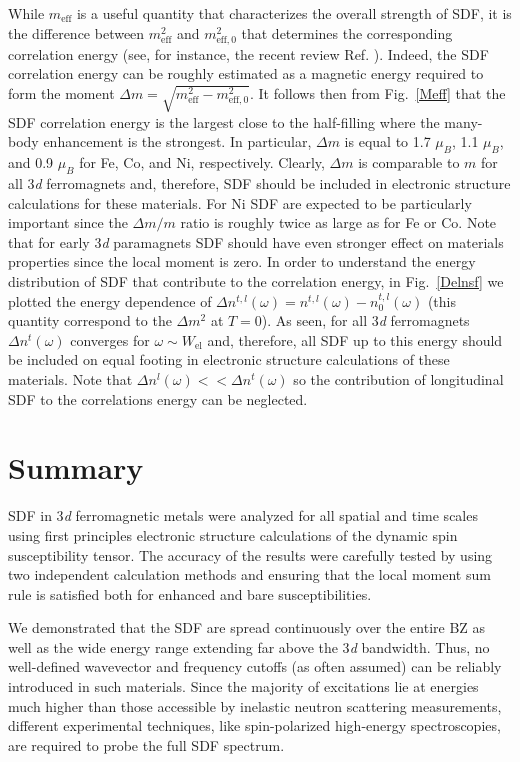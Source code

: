 While $m_{\text{eff}}$ is a useful quantity that characterizes the overall strength of SDF, it is the difference between $m^2_{\text{eff}}$ and $m^2_{\text{eff},0}$ that determines the corresponding correlation energy (see, for instance, the recent review Ref. \citep{RPA}). Indeed, the SDF correlation energy can be roughly estimated as a magnetic energy required to form the moment $\Delta m=\sqrt{m^2_{\text{eff}}-m^2_{\text{eff},0}}$. It follows then from Fig.~\ref{Meff} that the SDF correlation energy is the largest close to the half-filling where the many-body enhancement is the strongest. In particular, $\Delta m$ is equal to 1.7 $\mu_B$, 1.1 $\mu_B$, and 0.9 $\mu_B$ for Fe, Co, and Ni, respectively. Clearly, $\Delta m$ is comparable to $m$ for all 3\emph{d} ferromagnets and, therefore, SDF should be included in electronic structure calculations for these materials. For Ni SDF are expected to be particularly important since the $\Delta m/m$ ratio is roughly twice as large as for Fe or Co. Note that for early 3\emph{d} paramagnets SDF should have even stronger effect on materials properties since the local moment is zero.\citep{Wysocki} In order to understand the energy distribution of SDF that contribute to the correlation energy, in Fig.~\ref{Delnsf} we plotted the energy dependence of $\Delta n^{t,l}(\omega)=n^{t,l}(\omega)-n^{t,l}_0(\omega)$ (this quantity correspond to the $\Delta m^2$ at $T=0$). As seen, for all 3\emph{d} ferromagnets $\Delta n^t(\omega)$ converges for $\omega\sim W_{\text{el}}$ and, therefore, all SDF up to this energy should be included on equal footing in electronic structure calculations of these materials. Note that $\Delta n^l(\omega)<<\Delta n^t(\omega)$ so the contribution of longitudinal SDF to the correlations energy can be neglected.
\FloatBarrier

\section{Summary}

SDF in 3\emph{d} ferromagnetic metals were analyzed for all spatial and time scales using first principles electronic structure calculations of the dynamic spin susceptibility tensor. The accuracy of the results were carefully tested by using two independent calculation methods and ensuring that the local moment sum rule is satisfied both for enhanced and bare susceptibilities.

We demonstrated that the SDF are spread continuously over the entire BZ as well as the wide energy range extending far above the 3\emph{d} bandwidth. Thus, no well-defined wavevector and frequency cutoffs (as often assumed) can be reliably introduced in such materials. Since the majority of excitations lie at energies much higher than those accessible by inelastic neutron scattering measurements, different experimental techniques, like spin-polarized high-energy spectroscopies, are required to probe the full SDF spectrum.

